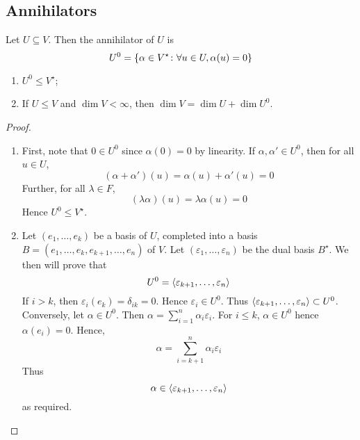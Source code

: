 \subsection{Annihilators}
\begin{definition}
	Let \( U \subseteq V \).
	Then the annihilator of \( U \) is
	\[
		U^0 = \qty{\alpha \in V^\star \colon \forall u \in U, \alpha(u) = 0}
	\]
\end{definition}
\begin{lemma}
	\begin{enumerate}
		\item \( U^0 \leq V^\star \);
		\item If \( U \leq V \) and \( \dim V < \infty \), then \( \dim V = \dim U + \dim U^0 \).
	\end{enumerate}
\end{lemma}
\begin{proof}
	\begin{enumerate}
		\item First, note that \( 0 \in U^0 \) since \( \alpha(0) = 0 \) by linearity.
		      If \( \alpha, \alpha' \in U^0 \), then for all \( u \in U \),
		      \[
			      (\alpha + \alpha')(u) = \alpha(u) + \alpha'(u) = 0
		      \]
		      Further, for all \( \lambda \in F \),
		      \[
			      (\lambda \alpha)(u) = \lambda \alpha(u) = 0
		      \]
		      Hence \( U^0 \leq V^\star \).
		\item Let \( (e_1, \dots, e_k) \) be a basis of \( U \), completed into a basis \( B = (e_1, \dots, e_k, e_{k+1}, \dots, e_n) \) of \( V \).
		      Let \( (\varepsilon_1, \dots, \varepsilon_n) \) be the dual basis \( B^\star \).
		      We then will prove that
		      \[
			      U^0 = \langle{} \varepsilon_{k+1}, \dots, \varepsilon_n \rangle
		      \]
		      If \( i > k \), then \( \varepsilon_i(e_k) = \delta_{ik} = 0 \).
		      Hence \( \varepsilon_i \in U^0 \).
		      Thus \( \langle{} \varepsilon_{k+1}, \dots, \varepsilon_n \rangle \subset U^0 \).
		      Conversely, let \( \alpha \in U^0 \).
		      Then \( \alpha = \sum_{i=1}^n \alpha_i \varepsilon_i \).
		      For \( i \leq k \), \( \alpha \in U^0 \) hence \( \alpha(e_i) = 0 \).
		      Hence,
		      \[
			      \alpha = \sum_{i=k+1}^n \alpha_i \varepsilon_i
		      \]
		      Thus
		      \[
			      \alpha \in \langle{} \varepsilon_{k+1}, \dots, \varepsilon_n \rangle
		      \]
		      as required.
	\end{enumerate}
\end{proof}

